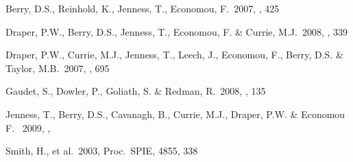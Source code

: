 \documentclass[11pt,twoside]{article}  %
\begin{document}
%
\begin{references}
 Berry, D.S., Reinhold, K., Jenness, T., Economou, F.\ 2007,
           \adassxvi, 425

 Draper, P.W., Berry, D.S., Jenness, T., Economou, F. 
\& Currie, M.J.\ 2008, \adassxvii, 339

 Draper, P.W., Currie, M.J., Jenness, T., Leech, J., Economou, F.,
Berry, D.S. \& Taylor, M.B.\ 2007, \adassxvi, 695

 Gaudet, S., Dowler, P., Goliath, S. \& Redman, R.\ 2008, 
\adassxvii, 135

 Jenness, T., Berry, D.S., Cavanagh, B., Currie, M.J.,
Draper, P.W. \& Economou F. \ 2009, \adassxviii, 

 Smith, H., et al.\ 2003, Proc.\ SPIE, 4855, 338

\end{references}

\end{document}
